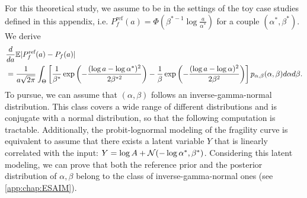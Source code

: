     For this theoretical study, we assume to be in the settings of the toy case studies defined in this appendix, i.e. $P^{\text{ref}}_f(a)=\Phi\left(\beta^{\ast -1}\log\frac{a}{\alpha^{\ast}}\right)$ for a couple $(\alpha^\ast,\beta^\ast)$.
    We derive
        \begin{align}\nonumber
            &\frac{d}{da}\mathbb{E}|P^{\text{ref}}_f(a)-P_f(a)|\\ &= \frac{1}{a\sqrt{2\pi}}\int_\Theta \left[\frac{1}{\beta^\ast}\exp\left(-\frac{(\log a-\log\alpha^\ast)^2}{2\beta^{\ast 2}}\right)-\frac{1}{\beta} \exp\left(-\frac{(\log a-\log\alpha)^2}{2\beta^2}\right)\right] p_{\alpha,\beta}(\alpha,\beta)d\alpha d\beta. \label{eq:derive-P-EP}   
        \end{align}
    To pursue, we can assume that $(\alpha,\beta)$ follows an inverse-gamma-normal distribution. This class covers a wide range of different distributions and is conjugate with a normal distribution, so that the following computation is tractable. Additionally, the probit-lognormal modeling of the fragility curve is equivalent to assume that there exists a latent variable $Y$ that is linearly correlated with the input: $Y=\log A +\mathcal{N}(-\log\alpha^\ast,\beta^\ast)$. Considering this latent modeling, we can prove that both the reference prior and the posterior distribution of $\alpha,\beta$ belong to the class of inverse-gamma-normal ones (see \cref{app:chap:ESAIM}).
